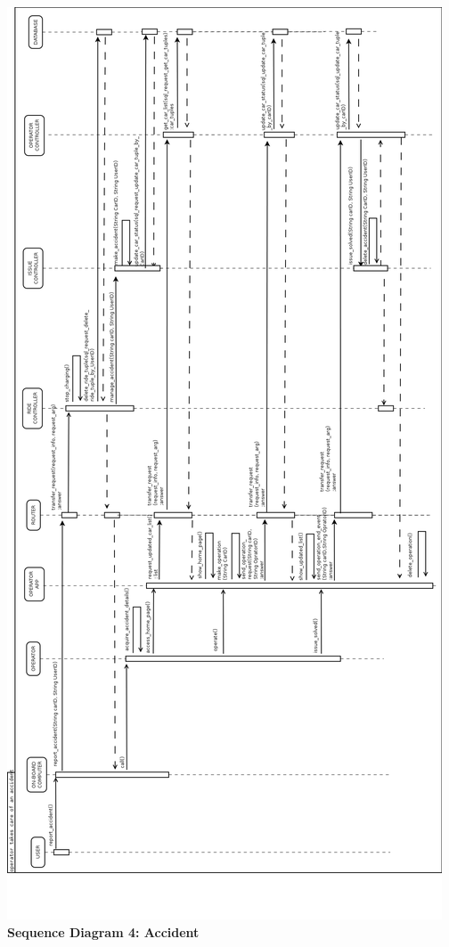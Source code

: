 \documentclass{article}
\begin{document}
\begin{flushleft}
\newpage
\includegraphics[scale=0.25]{seq4_accident} 
\newpage
\textbf{Sequence Diagram 4: Accident}
\break

\end{flushleft}
\end{document}
